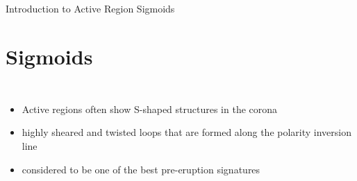 \documentclass{beamer}
\begin{document}
\begin{frame}{Introduction to Active Region Sigmoids}
\section{Sigmoids}
\begin{columns}[t]
\begin{itemize}
 \item Active regions often show S-shaped structures in the corona
 \item highly sheared and twisted loops that are formed along the polarity inversion line
 \item considered to be one of the best pre-eruption
signatures
\end{itemize}

\end{columns}
\end{frame}
\end{document}
